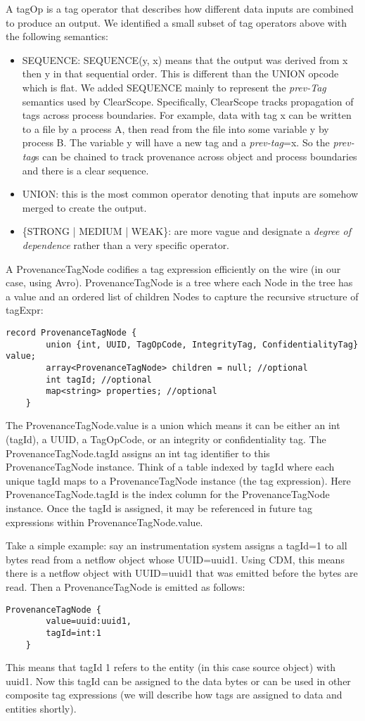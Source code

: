 A {\sf tagOp} is a tag operator that describes how different data inputs are combined to produce an output.
We identified a small subset of tag operators above with the following semantics: 
\begin{itemize}
\item {\sf SEQUENCE}: SEQUENCE(y, x) means that the output was derived from x then y in that sequential order. This is different than the UNION opcode which is flat. We added SEQUENCE mainly to represent the {\em prev-Tag} semantics used by ClearScope. Specifically, ClearScope tracks propagation of tags across process boundaries. For example, data with tag x can be written to a file by a process A, then read from the file into some variable y by process B. The variable y will have a new tag and a {\em prev-tag}=x. So the {\em prev-tag}s can be chained to track provenance across object and process boundaries and there is a clear sequence.
\item {\sf UNION}: this is the most common operator denoting that inputs are somehow merged to create the output. 
\item {\sf \{STRONG | MEDIUM | WEAK\}}: are more vague and designate a {\em degree of dependence} rather than a very specific operator.
\end{itemize}

A {\sf ProvenanceTagNode} codifies a tag expression efficiently on the wire (in our case, using Avro). ProvenanceTagNode is a tree where each Node in the tree has a value and an ordered list of children Nodes to capture the recursive structure of {\sf tagExpr}:
\begin{Verbatim}[fontsize=\small]
    record ProvenanceTagNode {
        union {int, UUID, TagOpCode, IntegrityTag, ConfidentialityTag} value;
        array<ProvenanceTagNode> children = null; //optional
        int tagId; //optional
        map<string> properties; //optional
    }
\end{Verbatim}
The ProvenanceTagNode.value is a union which means it can be either an int (tagId), a UUID, a TagOpCode, or an integrity or confidentiality tag. 
The ProvenanceTagNode.tagId assigns an int tag identifier to this ProvenanceTagNode instance. Think of a table indexed by tagId where each unique tagId maps to a ProvenanceTagNode instance (the tag expression). Here ProvenanceTagNode.tagId is the index column for the ProvenanceTagNode instance. Once the tagId is assigned, it may be referenced in future tag expressions within ProvenanceTagNode.value.

Take a simple example: say an instrumentation system assigns a tagId=1 to all bytes read from a netflow object whose UUID=uuid1. Using CDM, this means there is a netflow object with UUID=uuid1 that was emitted before the bytes are read. Then a ProvenanceTagNode is emitted as follows:
\begin{Verbatim}[fontsize=\small]
    ProvenanceTagNode {
        value=uuid:uuid1,
        tagId=int:1
    }
\end{Verbatim}
This means that tagId 1 refers to the entity (in this case source object) with uuid1. Now this tagId can be assigned to the data bytes or can be used in other composite tag expressions (we will describe how tags are assigned to data and entities shortly).

